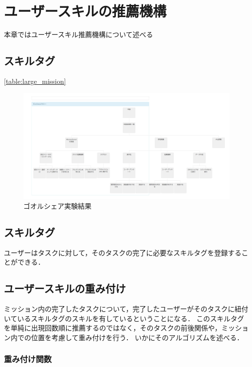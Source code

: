 \chapter{ユーザースキルの推薦機構}
本章ではユーザースキル推薦機構について述べる

\section{スキルタグ}

\ref{table:large_mission}

\begin{figure}[t]
	\begin{center}
		\includegraphics[width=0.9\linewidth]{assets/img/large_mission.png}
		\caption{ゴオルシェア実験結果}
		\label{img:large_mission}
	\end{center}
\end{figure}

\section{スキルタグ}
ユーザーはタスクに対して，そのタスクの完了に必要なスキルタグを登録することができる．

\section{ユーザースキルの重み付け}
ミッション内の完了したタスクについて，完了したユーザーがそのタスクに紐付いているスキルタグのスキルを有しているということになる．
このスキルタグを単純に出現回数順に推薦するのではなく，そのタスクの前後関係や，ミッション内での位置を考慮して重み付けを行う．
いかにそのアルゴリズムを述べる．

\subsection{重み付け関数}

